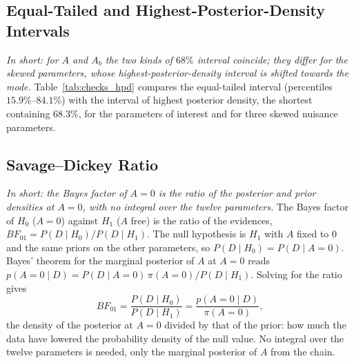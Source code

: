 \subsection{Equal-Tailed and Highest-Posterior-Density Intervals}
\label{sec:checks_hpd}
\emph{In short: for $A$ and $A_b$ the two kinds of $68\%$ interval coincide; they differ for the skewed parameters, whose highest-posterior-density interval is shifted towards the mode.}
Table~\ref{tab:checks_hpd} compares the equal-tailed interval (percentiles $15.9\%$--$84.1\%$) with the interval of highest posterior density, the shortest containing $68.3\%$, for the parameters of interest and for three skewed nuisance parameters.

\begin{table}[h]
\centering
{}
\caption{Equal-tailed and highest-posterior-density $68\%$ intervals and skewness of the marginal posteriors.}
\label{tab:checks_hpd}
\end{table}

\subsection{Savage--Dickey Ratio}
\label{sec:appendix_sd}
\emph{In short: the Bayes factor of $A=0$ is the ratio of the posterior and prior densities at $A=0$, with no integral over the twelve parameters.}
The Bayes factor of $H_0$ ($A=0$) against $H_1$ ($A$ free) is the ratio of the evidences, $BF_{01}=P(D\mid H_0)/P(D\mid H_1)$. The null hypothesis is $H_1$ with $A$ fixed to $0$ and the same priors on the other parameters, so $P(D\mid H_0)=P(D\mid A=0)$. Bayes' theorem for the marginal posterior of $A$ at $A=0$ reads $p(A=0\mid D)=P(D\mid A=0)\,\pi(A=0)/P(D\mid H_1)$. Solving for the ratio gives
\[
BF_{01}=\frac{P(D\mid H_0)}{P(D\mid H_1)}=\frac{p(A=0\mid D)}{\pi(A=0)},
\]
the density of the posterior at $A=0$ divided by that of the prior: how much the data have lowered the probability density of the null value. No integral over the twelve parameters is needed, only the marginal posterior of $A$ from the chain.


